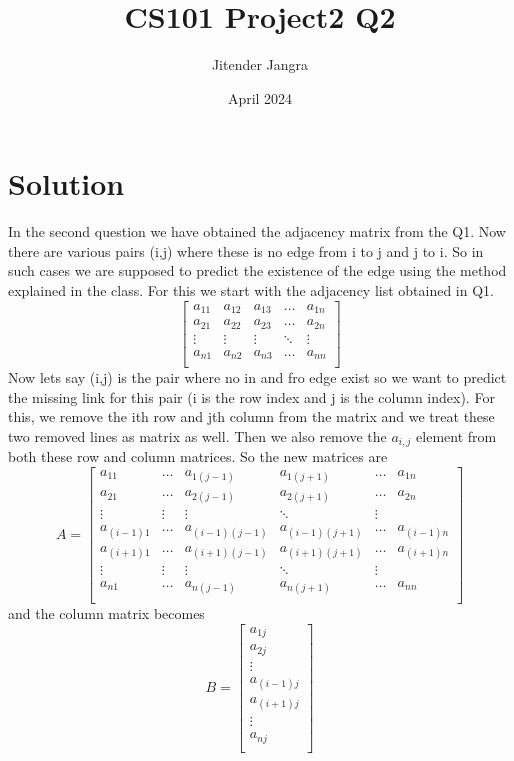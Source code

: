 \documentclass{article}
\title{CS101 Project2 Q2}
\author{Jitender Jangra}
\date{April 2024}
\begin{document}
\maketitle

\section{Solution}
In the second question we have obtained the adjacency matrix from the Q1. Now there are various pairs (i,j) where these is no edge from i to j and j to i. So in such cases we are supposed to predict the existence of the edge using the method explained in the class.\newline
For this we start with the adjacency list obtained in Q1. 
\[
\begin{bmatrix}
a_{11} & a_{12} & a_{13} & \dots & a_{1n} \\
a_{21} & a_{22} & a_{23} & \dots & a_{2n} \\
\vdots & \vdots & \vdots & \ddots & \vdots \\
a_{n1} & a_{n2} & a_{n3} & \dots & a_{nn} \\
\end{bmatrix}
\]
\newline Now lets say (i,j) is the pair where no in and fro edge exist so we want to predict the missing link for this pair (i is the row index and j is the column index). For this, we remove the ith row and jth column from the matrix and we treat these two removed lines as matrix as well. Then we also remove the $a_{i,j}$ element from both these row and column matrices. So the new matrices are \newline
\[
A =
\begin{bmatrix}
a_{11} & \dots & a_{1(j-1)} & a_{1(j+1)}& \dots & a_{1n} \\
a_{21} & \dots & a_{2(j-1)} & a_{2(j+1)}& \dots & a_{2n} \\
\vdots & \vdots & \vdots & \ddots & \vdots \\
a_{(i-1)1} & \dots & a_{(i-1)(j-1)} & a_{(i-1)(j+1)}& \dots & a_{(i-1)n} \\
a_{(i+1)1} & \dots & a_{(i+1)(j-1)} & a_{(i+1)(j+1)}& \dots & a_{(i+1)n} \\
\vdots & \vdots & \vdots & \ddots & \vdots \\
a_{n1} & \dots & a_{n(j-1)} & a_{n(j+1)}& \dots & a_{nn} \\
\end{bmatrix}
\]
and the column matrix becomes 
\[
B=
\begin{bmatrix}
a_{1j} \\
a_{2j} \\
\vdots \\
a_{(i-1)j} \\
a_{(i+1)j}  \\
\vdots \\
a_{nj} \\
\end{bmatrix}
\]
\end{document}
